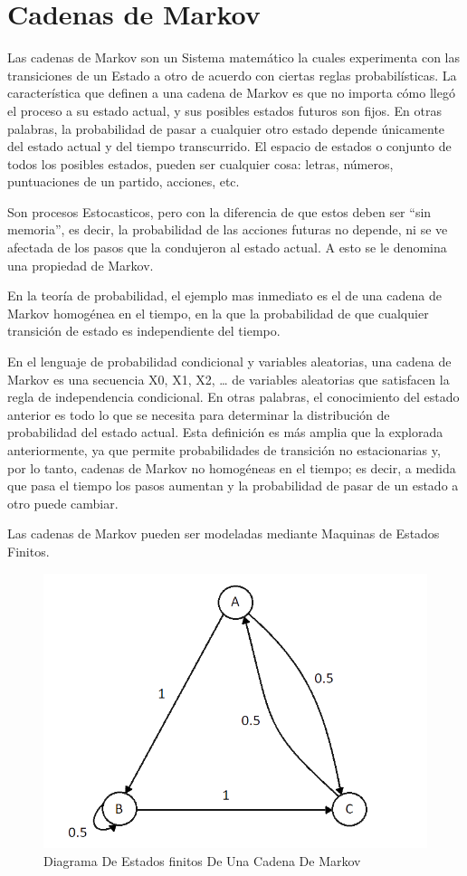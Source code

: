 \documentclass[12pt, a4paper, titlepage]{report}
\begin{document}
		\section{Cadenas de Markov}
	    Las cadenas de Markov son un \Gls{Sistema} matemático la cuales experimenta con las transiciones de un \Gls{Estado} a otro de acuerdo con ciertas reglas probabilísticas. La característica que definen a una cadena de Markov es que no importa cómo llegó el proceso a su estado actual, y sus posibles estados futuros son fijos. En otras palabras, la probabilidad de pasar a cualquier otro estado depende únicamente del estado actual y del tiempo transcurrido. El espacio de estados o conjunto de todos los posibles estados, pueden ser cualquier cosa: letras, números, puntuaciones de un partido, acciones, etc.\par
		Son procesos \Gls{Estocastico}s, pero con la diferencia de que estos deben ser “sin memoria”, es decir, la probabilidad de las acciones futuras no depende, ni se ve afectada de los pasos que la condujeron al estado actual. A esto se le denomina una propiedad de Markov.\par
		En la teoría de probabilidad, el ejemplo mas inmediato es el de una cadena de Markov homogénea en el tiempo, en la que la probabilidad de que cualquier transición de estado es independiente del tiempo.\par
		En el lenguaje de probabilidad condicional y variables aleatorias, una cadena de Markov es una secuencia X0, X1, X2, … de variables aleatorias que satisfacen la regla de independencia condicional.
		En otras palabras, el conocimiento del estado anterior es todo lo que se necesita para determinar la distribución de probabilidad del estado actual. Esta definición es más amplia que la explorada anteriormente, ya que permite probabilidades de transición no estacionarias y, por lo tanto, cadenas de Markov no homogéneas en el tiempo; es decir, a medida que pasa el tiempo los pasos aumentan y la probabilidad de pasar de un estado a otro puede cambiar. \cite{refMarkov}\par
		Las cadenas de Markov pueden ser modeladas mediante \Gls{Maquinas de Estados Finitos}.\par
		\begin{figure}[H]
			\includegraphics[width=12cm]{./imagenes/MarcoTeorico/Markov/CMarkov.png}
			\centering 
			\caption{Diagrama De Estados finitos De Una Cadena De Markov}
		\end{figure}
\end{document}
